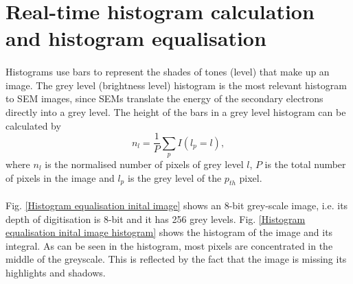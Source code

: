\documentclass[12pt, twocolumn]{report}
\begin{document}
\section{Real-time histogram calculation and histogram equalisation}
\paragraph{}
Histograms use bars to represent the shades of tones (level) that make up an image. The grey level (brightness level) histogram is the most relevant histogram to SEM images, since SEMs translate the energy of the secondary electrons directly into a grey level. The height of the bars in a grey level histogram can be calculated by
\begin{equation}
    n_l = \frac{1}{P} \sum_{p} I(l_p=l),
\end{equation}
where $n_l$ is the normalised number of pixels of grey level $l$, $P$ is the total number of pixels in the image and $l_p$ is the grey level of the $p_{th}$ pixel. 

\paragraph{}
Fig. \ref{Histogram equalisation inital image} shows an 8-bit grey-scale image, i.e. its depth of digitisation is 8-bit and it has 256 grey levels. Fig. \ref{Histogram equalisation inital image histogram} shows the histogram of the image and its integral. As can be seen in the histogram, most pixels are concentrated in the middle of the greyscale. This is reflected by the fact that the image is missing its highlights and shadows.
\end{document}
